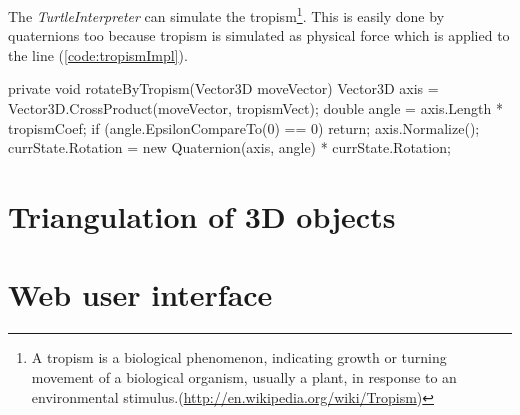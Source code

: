 The \emph{TurtleInterpreter} can simulate the tropism\footnote{A tropism is a biological phenomenon, indicating growth or turning movement of a biological organism, usually a plant, in response to an environmental stimulus.(\url{http://en.wikipedia.org/wiki/Tropism})}.
This is easily done by quaternions too because tropism is simulated as physical force which is applied to the line \cite[p.~58]{PL91} (\autoref{code:tropismImpl}).

\begin{Csharp}[label=code:tropismImpl,caption={Implementation of the tropism which is applied after each line}]
private void rotateByTropism(Vector3D moveVector) {
	Vector3D axis = Vector3D.CrossProduct(moveVector, tropismVect);
	double angle = axis.Length * tropismCoef;
	if (angle.EpsilonCompareTo(0) == 0) {
		return;
	}
	axis.Normalize();
	currState.Rotation = new Quaternion(axis, angle) * currState.Rotation;
}
\end{Csharp}


\section{Triangulation of 3D objects}





\section{Web user interface}

















